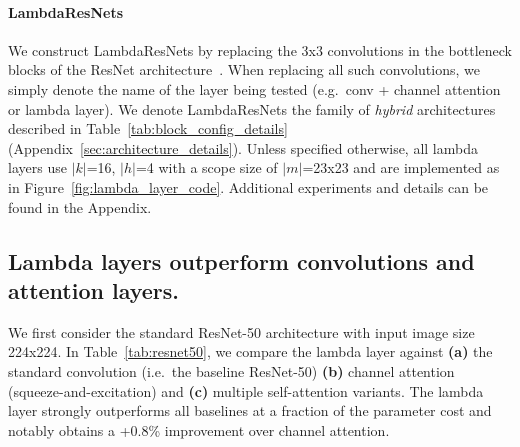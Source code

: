 \documentclass{article} \usepackage{iclr2021_conference,times}
\begin{document}
\vspace{-0.1cm}
\paragraph{LambdaResNets}
We construct LambdaResNets by replacing the 3x3 convolutions in the bottleneck blocks of the ResNet architecture~\citep{he2015deep}.
When replacing all such convolutions, we simply denote the name of the layer being tested (e.g.\ conv + channel attention or lambda layer).
We denote LambdaResNets the family of \emph{hybrid} architectures described in Table~\ref{tab:block_config_details} (Appendix~\ref{sec:architecture_details}).
Unless specified otherwise, all lambda layers use $|k|$=16, $|h|$=4 with a scope size of $|m|$=23x23 and are implemented as in Figure~\ref{fig:lambda_layer_code}.
Additional experiments and details can be found in the Appendix.

\vspace{-0.1cm}
\subsection{Lambda layers outperform convolutions and attention layers.}
We first consider the standard ResNet-50 architecture with input image size 224x224.
In Table~\ref{tab:resnet50}, we compare the lambda layer against 
\textbf{(a)} the standard convolution (i.e.\ the baseline ResNet-50)
\textbf{(b)} channel attention (squeeze-and-excitation) and
\textbf{(c)} multiple self-attention variants.
The lambda layer strongly outperforms all baselines at a fraction of the parameter cost and notably obtains a +0.8\% improvement over channel attention.
\end{document}
